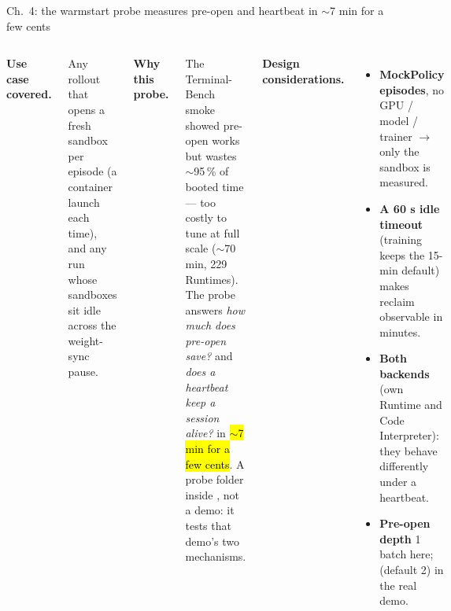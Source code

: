 \begin{frame}{Ch.\ 4: the warmstart probe measures pre-open and heartbeat in $\sim$7 min for a few cents}
\begin{columns}[T]
{\footnotesize\textbf{\color{awsteal}Use case covered.}\par}
{\scriptsize Any rollout that opens a fresh sandbox per episode (a container launch each time), and any run whose sandboxes sit idle across the weight-sync pause.\par}
\vspace{2mm}
{\footnotesize\textbf{\color{awsteal}Why this probe.}\par}
{\scriptsize The Terminal-Bench smoke showed pre-open works but wastes $\sim$95\,\% of booted time --- too costly to tune at full scale ($\sim$70 min, 229 Runtimes). The probe answers \emph{how much does pre-open save?} and \emph{does a heartbeat keep a session alive?} in \hl{$\sim$7 min for a few cents}. A probe folder inside , not a demo: it tests that demo's two mechanisms.\par}
{\footnotesize\textbf{\color{awsteal}Design considerations.}\par}
\begin{itemize}\scriptsize\setlength{\itemsep}{1.4mm}
\item \textbf{MockPolicy episodes}, no GPU / model / trainer $\rightarrow$ only the sandbox is measured.
\item \textbf{A 60 s idle timeout} (training keeps the 15-min default) makes reclaim observable in minutes.
\item \textbf{Both backends} (own Runtime and Code Interpreter): they behave differently under a heartbeat.
\item \textbf{Pre-open depth} 1 batch here;  (default 2) in the real demo.
\end{itemize}
\end{columns}
\end{frame}

